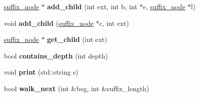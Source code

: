 \begin{DoxyCompactItemize}
\mbox{\label{classsuffix__node_af1c5aa14ccae896455815cd4c5a4d1a8}} 
\mbox{\hyperlink{classsuffix__node}{suffix\+\_\+node}} $\ast$ {\bfseries add\+\_\+child} (int ext, int b, int $\ast$e, \mbox{\hyperlink{classsuffix__node}{suffix\+\_\+node}} $\ast$l)
\item 
\mbox{\label{classsuffix__node_ac25245d1931525b91678167fe07c4eb7}} 
void {\bfseries add\+\_\+child} (\mbox{\hyperlink{classsuffix__node}{suffix\+\_\+node}} $\ast$c, int ext)
\item 
\mbox{\label{classsuffix__node_a1ce4cfd4bf2136222a1162dd2555e2d3}} 
\mbox{\hyperlink{classsuffix__node}{suffix\+\_\+node}} $\ast$ {\bfseries get\+\_\+child} (int ext)
\item 
\mbox{\label{classsuffix__node_a50ab619252f0ad2091337bbf9688f9bf}} 
bool {\bfseries contains\+\_\+depth} (int depth)
\item 
\mbox{\label{classsuffix__node_a050ba7b3d5859d1dafb053e34a16663b}} 
void {\bfseries print} (std\+::string s)
\item 
\mbox{\label{classsuffix__node_a931f49a361496b16bfa52609ae82630d}} 
bool {\bfseries walk\+\_\+next} (int \&beg, int \&suffix\+\_\+length)
\end{DoxyCompactItemize}
